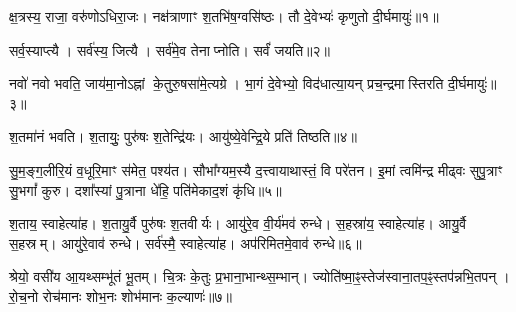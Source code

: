 
क्ष॒त्रस्य॒ राजा॒ वरु॑णोऽधिरा॒जः। नक्ष॑त्राणाꣳ श॒तभि॑ष॒ग्वसि॑ष्ठः। तौ दे॒वेभ्यः॑ कृणुतो दी॒र्घमायुः॑॥१॥

सर्व॒स्याप्त्यै। सर्व॑स्य॒ जित्यै। सर्व॑मे॒व तेनाप्नोति। सर्वं॑ जयति॥२॥

नवो॑ नवो भवति॒ जाय॑मा॒नोऽह्नां के॒तुरु॒षसा॑मे॒त्यग्रे।
भा॒गं दे॒वेभ्यो॒ विद॑धात्या॒यन् प्रच॒न्द्रमास्तिरति दी॒र्घमायुः॑॥३॥

श॒तमा॑नं भवति। श॒तायुः॒ पुरु॑षः श॒तेन्द्रि॑यः। आयु॑ष्ये॒वेन्द्रि॒ये प्रति॑ तिष्ठति॥४॥

सु॒म॒ङ्ग॒लीरि॒यं व॒धूरि॒माꣳ स॑मेत॒ पश्य॑त। 
सौभा᳚ग्यम॒स्यै द॒त्त्वायाथास्तं॒ वि परे॑तन। 
इ॒मां त्वमि॑न्द्र मीढ्वः सुपु॒त्राꣳ सु॒भगां᳚ कुरु। 
दशा᳚स्यां पु॒त्राना धे॑हि॒ पति॑मेकाद॒शं कृ॑धि॥५॥ 


श॒ताय॒ स्वाहेत्या॑ह। श॒तायु॒र्वै पुरु॑षः श॒तवीर्यः। आयु॑रे॒व वी॒र्य॑मव॑ रुन्धे। स॒हस्रा॑य॒ स्वाहेत्या॑ह। आयु॒र्वै स॒हस्रम्। आयु॑रे॒वाव॑ रुन्धे। सर्व॑स्मै॒ स्वाहेत्या॑ह। अप॑रिमितमे॒वाव॑ रुन्धे॥६॥


श्रेयो॒ वसी॑य आ॒यथ्सम्भू॑तं भू॒तम्। 
चि॒त्रः के॒तुः प्र॒भाना॒भान्थ्स॒म्भान्। 
ज्योति॑ष्मा॒ꣴ॒स्तेज॑स्वाना॒तप॒ꣴ॒स्तप॑न्नभि॒\-तपन्। 
रो॒च॒नो रोच॑मानः शोभ॒नः शोभ॑मानः क॒ल्याणः॑॥७॥

